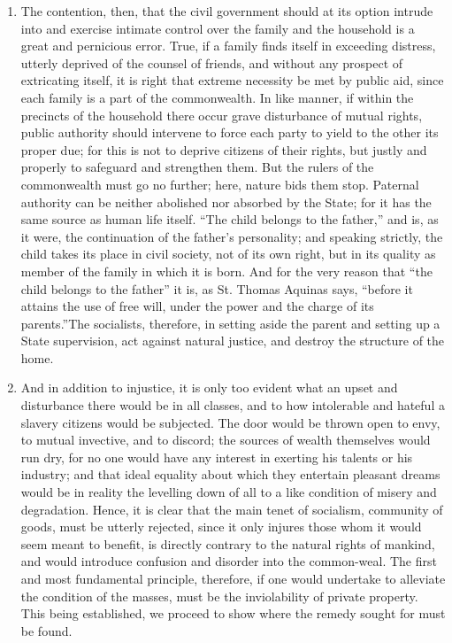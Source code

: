 \documentclass{book}
\begin{document}
\begin{enumerate}
	\item The contention, then, that the civil government should at its option intrude into and exercise intimate control over the family and the household is a great and pernicious error. True, if a family finds itself in exceeding distress, utterly deprived of the counsel of friends, and without any prospect of extricating itself, it is right that extreme necessity be met by public aid, since each family is a part of the commonwealth. In like manner, if within the precincts of the household there occur grave disturbance of mutual rights, public authority should intervene to force each party to yield to the other its proper due; for this is not to deprive citizens of their rights, but justly and properly to safeguard and strengthen them. But the rulers of the commonwealth must go no further; here, nature bids them stop. Paternal authority can be neither abolished nor absorbed by the State; for it has the same source as human life itself. “The child belongs to the father,” and is, as it were, the continuation of the father’s personality; and speaking strictly, the child takes its place in civil society, not of its own right, but in its quality as member of the family in which it is born. And for the very reason that “the child belongs to the father” it is, as St. Thomas Aquinas says, “before it attains the use of free will, under the power and the charge of its parents.”\footnotemark[3] The socialists, therefore, in setting aside the parent and setting up a State supervision, act against natural justice, and destroy the structure of the home.


	\item And in addition to injustice, it is only too evident what an upset and disturbance there would be in all classes, and to how intolerable and hateful a slavery citizens would be subjected. The door would be thrown open to envy, to mutual invective, and to discord; the sources of wealth themselves would run dry, for no one would have any interest in exerting his talents or his industry; and that ideal equality about which they entertain pleasant dreams would be in reality the levelling down of all to a like condition of misery and degradation. Hence, it is clear that the main tenet of socialism, community of goods, must be utterly rejected, since it only injures those whom it would seem meant to benefit, is directly contrary to the natural rights of mankind, and would introduce confusion and disorder into the common-weal. The first and most fundamental principle, therefore, if one would undertake to alleviate the condition of the masses, must be the inviolability of private property. This being established, we proceed to show where the remedy sought for must be found.



\end{enumerate}
\end{document}
